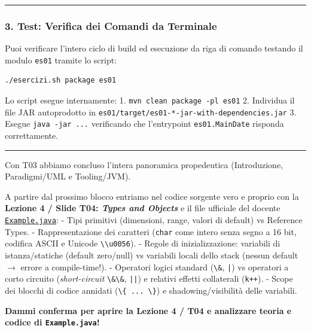 \documentclass[11pt,a4paper]{article}
\newcommand{\passthrough}[1]{#1}
\begin{document}
\begin{center}\rule{0.5\linewidth}{0.5pt}\end{center}

\subsubsection{3. Test: Verifica dei Comandi da
Terminale}\label{test-verifica-dei-comandi-da-terminale}

Puoi verificare l'intero ciclo di build ed esecuzione da riga di comando
testando il modulo \passthrough{\lstinline!es01!} tramite lo script:

\begin{lstlisting}[language=bash]
./esercizi.sh package es01
\end{lstlisting}

Lo script esegue internamente: 1.
\passthrough{\lstinline!mvn clean package -pl es01!} 2. Individua il
file JAR autoprodotto in
\passthrough{\lstinline!es01/target/es01-*-jar-with-dependencies.jar!}
3. Esegue \passthrough{\lstinline!java -jar ...!} verificando che
l'entrypoint \passthrough{\lstinline!es01.MainDate!} risponda
correttamente.

\begin{center}\rule{0.5\linewidth}{0.5pt}\end{center}

\begin{studynote} Con T03 abbiamo concluso l'intera panoramica propedeutica
(Introduzione, Paradigmi/UML e Tooling/JVM).

A partire dal prossimo blocco entriamo nel codice sorgente vero e
proprio con la \textbf{Lezione 4 / Slide T04: \emph{Types and Objects}}
e il file ufficiale del docente
\href{file:///home/wally/Documenti/GitHub/Programmazione-II/25-26/Teoria-e-Esercitazioni/Codice-20260902/Lezione04/Example.java}{\passthrough{\lstinline!Example.java!}}:
- Tipi primitivi (dimensioni, range, valori di default) vs Reference
Types. - Rappresentazione dei caratteri (\passthrough{\lstinline!char!}
come intero senza segno a 16 bit, codifica ASCII e Unicode
\passthrough{\lstinline!\\u0056!}). - Regole di inizializzazione:
variabili di istanza/statiche (default zero/null) vs variabili locali
dello stack (nessun default \(\rightarrow\) errore a compile-time!). -
Operatori logici standard (\passthrough{\lstinline!\&!},
\passthrough{\lstinline!|!}) vs operatori a corto circuito
(\emph{short-circuit} \passthrough{\lstinline!\&\&!},
\passthrough{\lstinline!||!}) e relativi effetti collaterali
(\passthrough{\lstinline!k++!}). - Scope dei blocchi di codice annidati
(\passthrough{\lstinline!\{ ... \}!}) e shadowing/visibilità delle
variabili.
\end{studynote}

\textbf{Dammi conferma per aprire la Lezione 4 / T04 e analizzare teoria
e codice di \passthrough{\lstinline!Example.java!}!}
\end{document}
